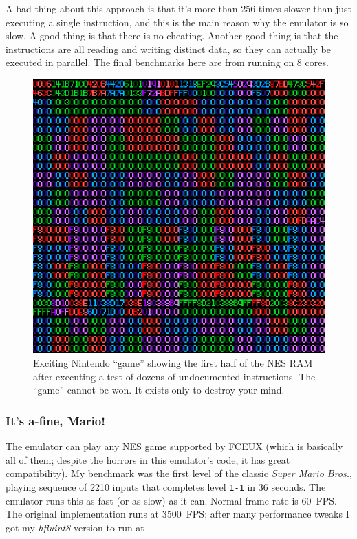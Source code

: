\documentclass[twocolumn]{article}
\begin{document}
A bad thing about this approach is that it's more than 256 times slower
than just executing a single instruction, and this is the main reason
why the emulator is so slow. A good thing is that there is no cheating.
Another good thing is that the instructions are all reading and writing
distinct data, so they can actually be executed in parallel. The final
benchmarks here are from running on 8 cores.

\begin{figure}[tp]
  \begin{center}
    \includegraphics[width=0.9 \linewidth]{testrom}
  \end{center}
  \caption{
    Exciting Nintendo ``game'' showing the first half of the NES RAM after
    executing a test of dozens of undocumented instructions.
    The ``game'' cannot be won. It exists only to destroy your mind.
  } \label{fig:testrom}
\end{figure}

\subsubsection{It's a-fine, Mario!}

The emulator can play any NES game supported by FCEUX (which is
basically all of them; despite the horrors in this emulator's code, it
has great compatibility). My benchmark was the first level of the
classic {\it Super Mario Bros.}, playing sequence of 2210 inputs that
completes level \verb+1-1+ in 36 seconds. The emulator runs this as
fast (or as slow) as it can. Normal frame rate is 60~FPS. The original
implementation runs at 3500~FPS; after many performance tweaks I got
my {\it hfluint8} version to run at
\end{document}
